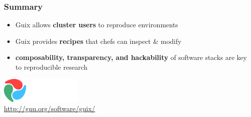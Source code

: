 \documentclass{beamer}
\newcommand{\highlight}[1]{\alert{\textbf{#1}}}
\begin{document}
\begin{frame}
  \frametitle{Summary}

  \Large{
    \begin{itemize}
    \item<1-> Guix allows \highlight{cluster users} to reproduce
      environments
    \item<2-> Guix provides \highlight{recipes} that chefs can
      inspect \& modify
    \item<3-> \highlight{composability, transparency, and hackability}
      of software stacks are key to reproducible research
    \end{itemize}
  }
\end{frame}



\begin{frame}[plain]

\vfill{
  \vspace{6.5cm}
  \hfill{\includegraphics[width=0.3\textwidth]{images/guix-logo-white}}\\[0.2cm]
  \hfill{\alert{\url{http://gnu.org/software/guix/}}}
}

\end{frame}
\end{document}
